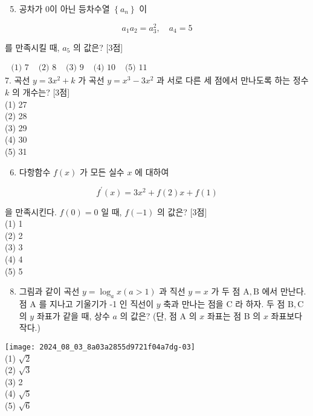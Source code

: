 \documentclass[10pt]{article}
\begin{document}
\begin{enumerate}
  \setcounter{enumi}{4}
  \item 공차가 0이 아닌 등차수열 \(\left\{a_{n}\right\}\) 이
\end{enumerate}

\[
a_{1} a_{2}=a_{3}^{2}, \quad a_{4}=5
\]

를 만족시킬 때, \(a_{5}\) 의 값은? [3점]

\(\begin{array}{lllll}\text { (1) } 7 & \text { (2) } 8 & \text { (3) } 9 & \text { (4) } 10 & \text { (5) } 11\end{array}\)\\
7. 곡선 \(y=3 x^{2}+k\) 가 곡선 \(y=x^{3}-3 x^{2}\) 과 서로 다른 세 점에서 만나도록 하는 정수 \(k\) 의 개수는? [3점]\\
(1) 27\\
(2) 28\\
(3) 29\\
(4) 30\\
(5) 31

\begin{enumerate}
  \setcounter{enumi}{5}
  \item 다항함수 \(f(x)\) 가 모든 실수 \(x\) 에 대하여
\end{enumerate}

\[
f^{\prime}(x)=3 x^{2}+f(2) x+f(1)
\]

을 만족시킨다. \(f(0)=0\) 일 때, \(f(-1)\) 의 값은? [3점]\\
(1) 1\\
(2) 2\\
(3) 3\\
(4) 4\\
(5) 5

\begin{enumerate}
  \setcounter{enumi}{7}
  \item 그림과 같이 곡선 \(y=\log _{a} x(a>1)\) 과 직선 \(y=x\) 가 두 점 \(\mathrm{A}, \mathrm{B}\) 에서 만난다. 점 A 를 지나고 기울기가 -1 인 직선이 \(y\) 축과 만나는 점을 C 라 하자. 두 점 \(\mathrm{B}, \mathrm{C}\) 의 \(y\) 좌표가 같을 때, 상수 \(a\) 의 값은? (단, 점 A 의 \(x\) 좌표는 점 B 의 \(x\) 좌표보다 작다.)
\end{enumerate}

\texttt{[image: 2024\_08\_03\_8a03a2855d9721f04a7dg-03]}\\
(1) \(\sqrt{2}\)\\
(2) \(\sqrt{3}\)\\
(3) 2\\
(4) \(\sqrt{5}\)\\
(5) \(\sqrt{6}\)
\end{document}
